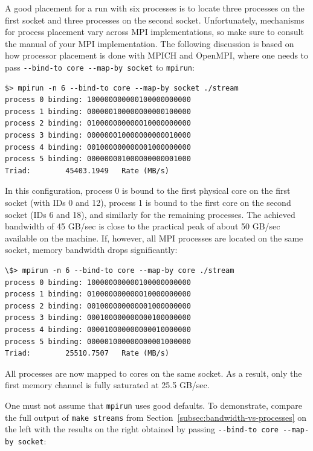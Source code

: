 {{A good placement for a run with six processes is to locate three processes on the first socket and three processes on the second socket.
Unfortunately, mechanisms for process placement vary across MPI implementations, so make sure to consult the manual of your MPI implementation.
The following discussion is based on how processor placement is done with MPICH and OpenMPI, where one needs to pass \lstinline|--bind-to core --map-by socket| to \lstinline|mpirun|:
\begin{lstlisting}[escapechar=\#]
$> mpirun -n 6 --bind-to core --map-by socket ./stream
process 0 binding: 100000000000100000000000
process 1 binding: 000000100000000000100000
process 2 binding: 010000000000010000000000
process 3 binding: 000000010000000000010000
process 4 binding: 001000000000001000000000
process 5 binding: 000000001000000000001000
Triad:        45403.1949   Rate (MB/s)
\end{lstlisting}
In this configuration, process 0 is bound to the first physical core on the first socket (with IDs 0 and 12), process 1 is bound to the first core on the second socket (IDs 6 and 18), and similarly for the remaining processes.
The achieved bandwidth of 45 GB/sec is close to the practical peak of about 50 GB/sec available on the machine.
If, however, all MPI processes are located on the same socket, memory bandwidth drops significantly:
\begin{lstlisting}[escapechar=\#]
\$> mpirun -n 6 --bind-to core --map-by core ./stream
process 0 binding: 100000000000100000000000
process 1 binding: 010000000000010000000000
process 2 binding: 001000000000001000000000
process 3 binding: 000100000000000100000000
process 4 binding: 000010000000000010000000
process 5 binding: 000001000000000001000000
Triad:        25510.7507   Rate (MB/s)
\end{lstlisting}
All processes are now mapped to cores on the same socket. As a result, only the first memory channel is fully saturated at 25.5 GB/sec.

One must not assume that \lstinline|mpirun| uses good defaults.
To demonstrate, compare the full output of \lstinline|make streams| from Section~\ref{subsec:bandwidth-vs-processes} on the left with the results on the right obtained by passing \lstinline|--bind-to core --map-by socket|:\\[.2em]

}}
